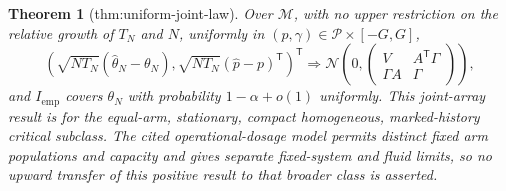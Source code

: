 \documentclass{article}
\newtheorem{theorem}{Theorem}
\begin{document}
\begin{theorem}[thm:uniform-joint-law]\label{thm:uniform-joint-law}
Over \(\mathcal M\), with no upper restriction on the relative growth of \(T_N\) and \(N\), uniformly in \((p,\gamma)\in\mathcal P\times[-G,G]\),
\[
 \left(\sqrt{NT_N}(\widehat\theta_N-\theta_N),
 \sqrt{NT_N}(\widehat p-p)^{\mathsf T}\right)^{\mathsf T}
 \Rightarrow
 \mathcal N\!\left(0,
 \begin{pmatrix}V&A^{\mathsf T}\Gamma\\ \Gamma A&\Gamma\end{pmatrix}\right),
\]
and \(I_{\mathrm{emp}}\) covers \(\theta_N\) with probability \(1-\alpha+o(1)\) uniformly.  This joint-array result is for the equal-arm, stationary, compact homogeneous, marked-history critical subclass.  The cited operational-dosage model permits distinct fixed arm populations and capacity and gives separate fixed-system and fluid limits, so no upward transfer of this positive result to that broader class is asserted.
\end{theorem}
\end{document}
